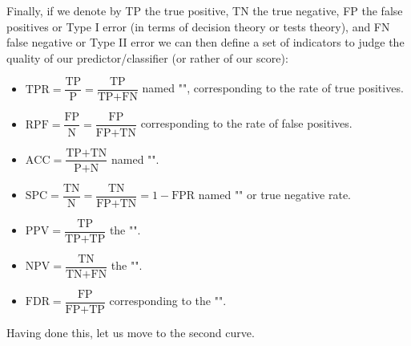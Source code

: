 	Finally, if we denote by TP the true positive, TN the true negative, FP the false positives or Type I error (in terms of decision theory or tests theory), and FN false negative or Type II error we can then define a set of indicators to judge the quality of our predictor/classifier (or rather of our score):
	
	\begin{itemize}
		\item $\text{TPR} = \dfrac{\text{TP}}{\text{P}} = \dfrac{\text{TP}}{\text{TP+FN}}$ named "", corresponding to the rate of true positives.
		
		\item $\text{RPF} = \dfrac{\text{FP}}{\text{N}} = \dfrac{\text{FP}}{\text{FP+TN}}$ corresponding to the rate of false positives.
		
		\item $\text{ACC} = \dfrac{\text{TP+TN}}{\text{P+N}}$ named "".
		
		 \item $\text{SPC} = \dfrac{\text{TN}}{\text{N}} = \dfrac{\text{TN}}{\text{FP+TN}}=1-\text{FPR}$ named "" or true negative rate.
		 
		 \item $\text{PPV} = \dfrac{\text{TP}}{\text{TP+TP}}$ the "".
		 
		 \item $\text{NPV} = \dfrac{\text{TN}}{\text{TN+FN}}$ the "".
		 
		 \item $\text{FDR} = \dfrac{\text{FP}}{\text{FP+TP}}$ corresponding to the  "".
	\end{itemize}
	Having done this, let us move to the second curve.
	
